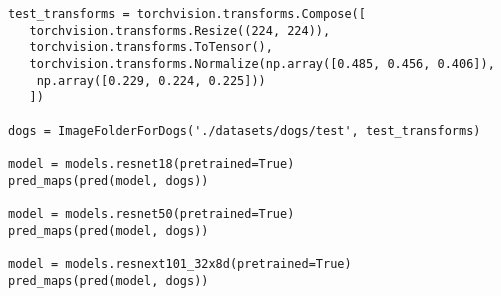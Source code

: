 \begin{verbatim}
test_transforms = torchvision.transforms.Compose([
   torchvision.transforms.Resize((224, 224)),
   torchvision.transforms.ToTensor(),
   torchvision.transforms.Normalize(np.array([0.485, 0.456, 0.406]),
    np.array([0.229, 0.224, 0.225]))
   ])
   
dogs = ImageFolderForDogs('./datasets/dogs/test', test_transforms)

model = models.resnet18(pretrained=True)
pred_maps(pred(model, dogs))

model = models.resnet50(pretrained=True)
pred_maps(pred(model, dogs))

model = models.resnext101_32x8d(pretrained=True)
pred_maps(pred(model, dogs))
\end{verbatim}